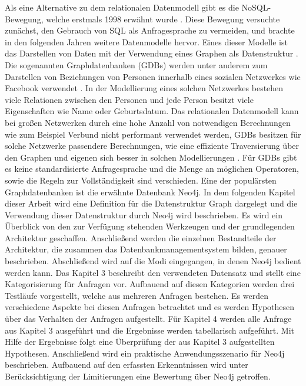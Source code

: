 Als eine Alternative zu dem relationalen Datenmodell gibt es die NoSQL-Bewegung, welche erstmals 1998 erwähnt wurde \parencite{NoSQL}. Diese Bewegung versuchte zunächst, den Gebrauch von SQL als Anfragesprache zu vermeiden, und brachte in den folgenden Jahren weitere Datenmodelle hervor. Eines dieser Modelle ist das Darstellen von Daten mit der Verwendung eines Graphen als Datenstruktur \parencite{miller2013graph}. Die sogenannten Graphdatenbanken (GDBs) werden unter anderem zum Darstellen von Beziehungen von Personen innerhalb eines sozialen Netzwerkes wie Facebook verwendet \parencite{han2011survey}. In der Modellierung eines solchen Netzwerkes bestehen viele Relationen zwischen den Personen und jede Person besitzt viele Eigenschaften wie Name oder Geburtsdatum. Das relationalen Datenmodell kann bei großen Netzwerken durch eine hohe Anzahl von notwendigen Berechnungen wie zum Beispiel Verbund nicht performant verwendet werden, GDBs besitzen für solche Netzwerke passendere Berechnungen, wie eine effiziente Traversierung über den Graphen und eigenen sich besser in solchen Modellierungen \parencite{miller2013graph}. Für GDBs gibt es keine standardisierte Anfragesprache und  die Menge an möglichen Operatoren, sowie die Regeln zur Vollständigkeit sind verschieden.
Eine der populärsten Graphdatenbanken ist die erwähnte Datenbank Neo4j\parencite{francis2018cypher}.  \newline 
In dem folgenden Kapitel dieser Arbeit wird eine Definition für die Datenstruktur Graph dargelegt und die Verwendung dieser Datenstruktur durch Neo4j wird beschrieben. Es wird ein Überblick von den zur Verfügung stehenden Werkzeugen und der grundlegenden Architektur geschaffen. Anschließend werden die einzelnen Bestandteile der Architektur, die zusammen das Datenbankmanagementsystem bilden, genauer beschrieben. Abschließend wird auf die Modi eingegangen, in denen Neo4j bedient werden
kann. \newline
Das Kapitel 3 beschreibt den verwendeten Datensatz und stellt eine Kategorisierung
für Anfragen vor. Aufbauend auf diesen Kategorien werden drei Testläufe vorgestellt, welche aus mehreren Anfragen bestehen. Es werden verschiedene Aspekte
bei diesen Anfragen betrachtet und es werden Hypothesen über das Verhalten der
Anfragen aufgestellt. \newline
Für Kapitel 4 werden alle Anfrage aus Kapitel 3 ausgeführt und die Ergebnisse werden tabellarisch aufgeführt. Mit Hilfe der Ergebnisse folgt eine Überprüfung der
aus Kapitel 3 aufgestellten Hypothesen. Anschließend wird ein praktische Anwendungsszenario für Neo4j beschrieben. Aufbauend auf den erfassten Erkenntnissen
wird unter Berücksichtigung der Limitierungen eine Bewertung über Neo4j getroffen.


